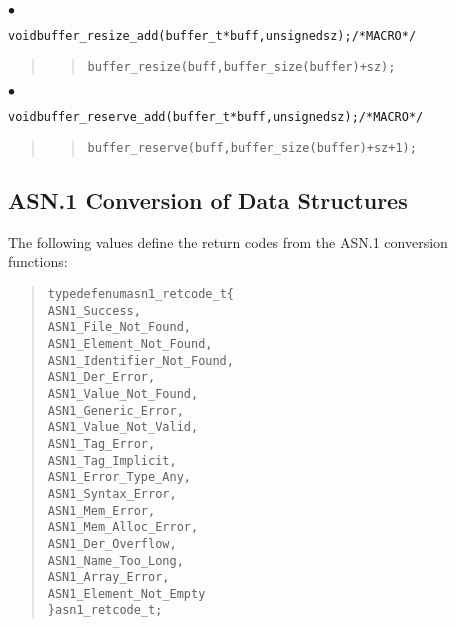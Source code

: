 \documentclass[a4paper]{article}
\newenvironment{code}%
{\begin{quote}\footnotesize\begin{alltt}}%
{\end{alltt}\end{quote}}%
\newenvironment{api}%
{\noindent$\bullet$\hfill\begin{minipage}[t]{0.97\linewidth}\footnotesize\begin{alltt}}%
{\end{alltt}\end{minipage}}%
\begin{document}
\begin{api}
void buffer_resize_add(buffer_t* buff, unsigned sz);      /* MACRO */
\end{api}
\begin{quote}\footnotesize
\begin{code}
buffer_resize(buff, buffer_size(buffer)+sz);
\end{code}
\end{quote}
\begin{api}
void buffer_reserve_add(buffer_t* buff, unsigned sz);     /* MACRO */
\end{api}
\begin{quote}\footnotesize
\begin{code}
buffer_reserve(buff, buffer_size(buffer)+sz+1);
\end{code}
\end{quote}

\subsection{ASN.1 Conversion of Data Structures}
The following values define the return codes from the ASN.1 conversion functions:
\begin{code}
typedef enum asn1_retcode_t \{
    ASN1_Success,
    ASN1_File_Not_Found,
    ASN1_Element_Not_Found,
    ASN1_Identifier_Not_Found,
    ASN1_Der_Error,
    ASN1_Value_Not_Found,
    ASN1_Generic_Error,
    ASN1_Value_Not_Valid,
    ASN1_Tag_Error,
    ASN1_Tag_Implicit,
    ASN1_Error_Type_Any,
    ASN1_Syntax_Error,
    ASN1_Mem_Error,
    ASN1_Mem_Alloc_Error,
    ASN1_Der_Overflow,
    ASN1_Name_Too_Long,
    ASN1_Array_Error,
    ASN1_Element_Not_Empty
\} asn1_retcode_t;
\end{code}
\end{document}
